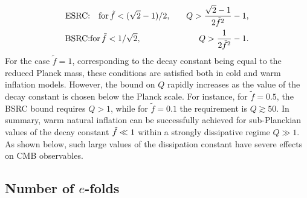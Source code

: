 \begin{eqnarray}
    \text{ESRC:}& \quad \text{for\,} \tilde{f} <(\sqrt{2}-1)/2,\quad &Q>\frac{\sqrt{2}-1}{2\tilde{f}^2}-1, \label{eq:ch3-WI_SRc3} \\
    \text{BSRC:}& \text{for\,} \tilde{f} <1/\sqrt{2}, \quad &Q>\frac{1}{2\tilde{f}^2}-1. \label{eq:ch3-WI_SRc4}
\end{eqnarray}
For the case $\tilde{f}= 1$, corresponding to the decay constant being equal to the reduced Planck mass, these conditions are satisfied both in cold and warm inflation models. However, the bound on $Q$ rapidly increases as the value of the decay constant is chosen below the Planck scale. For instance, for $\tilde{f}=0.5$, the BSRC bound requires $Q>1$, while for $\tilde{f}=0.1$ the requirement is $Q\gtrsim 50$. In summary, warm natural inflation can be successfully achieved for sub-Planckian values of the decay constant $\Tilde{f}\ll 1$ within a strongly dissipative regime $Q \gg 1$. As shown below, such large values of the dissipation constant have severe effects on CMB observables.

\subsection{Number of $e$-folds}

